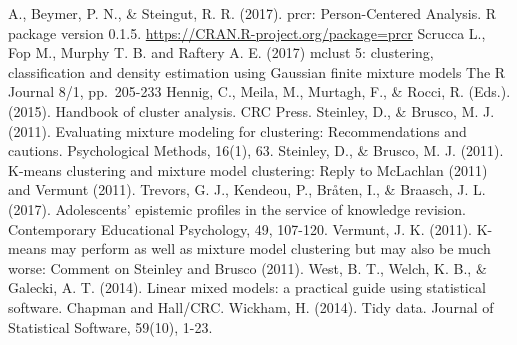 \documentclass[man]{apa6}
\begin{document}
A., Beymer, P. N., \& Steingut, R. R. (2017). prcr: Person-Centered
Analysis. R package version 0.1.5.
\url{https://CRAN.R-project.org/package=prcr} Scrucca L., Fop M., Murphy
T. B. and Raftery A. E. (2017) mclust 5: clustering, classification and
density estimation using Gaussian finite mixture models The R Journal
8/1, pp.~205-233 Hennig, C., Meila, M., Murtagh, F., \& Rocci, R.
(Eds.). (2015). Handbook of cluster analysis. CRC Press. Steinley, D.,
\& Brusco, M. J. (2011). Evaluating mixture modeling for clustering:
Recommendations and cautions. Psychological Methods, 16(1), 63.
Steinley, D., \& Brusco, M. J. (2011). K-means clustering and mixture
model clustering: Reply to McLachlan (2011) and Vermunt (2011). Trevors,
G. J., Kendeou, P., Bråten, I., \& Braasch, J. L. (2017). Adolescents'
epistemic profiles in the service of knowledge revision. Contemporary
Educational Psychology, 49, 107-120. Vermunt, J. K. (2011). K-means may
perform as well as mixture model clustering but may also be much worse:
Comment on Steinley and Brusco (2011). West, B. T., Welch, K. B., \&
Galecki, A. T. (2014). Linear mixed models: a practical guide using
statistical software. Chapman and Hall/CRC. Wickham, H. (2014). Tidy
data. Journal of Statistical Software, 59(10), 1-23.

\begingroup
\setlength{\parindent}{-0.5in} \setlength{\leftskip}{0.5in}

\hypertarget{refs}{}

\endgroup
\end{document}
